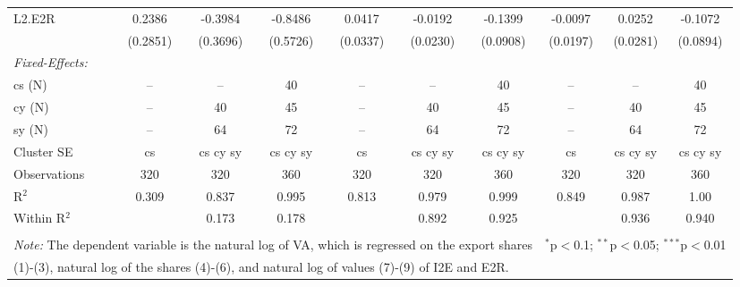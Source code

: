 \documentclass[a4paper]{article}
\begin{document}
\begin{table}[h!]
{\begin{tabular}[t]{lccccccccc}
L2.E2R&0.2386 & -0.3984 & -0.8486 & 0.0417 & -0.0192 & -0.1399 & -0.0097 & 0.0252 & -0.1072\\
  &(0.2851) & (0.3696) & (0.5726) & (0.0337) & (0.0230) & (0.0908) & (0.0197) & (0.0281) & (0.0894)\\%
\midrule \emph{Fixed-Effects:} &   &   &   &   &   &  \\
cs (N) & -- & -- & 40 & -- & -- & 40 & -- & -- & 40\\
cy (N) & -- & 40 & 45 & -- & 40 & 45 & -- & 40 & 45\\
sy (N) & -- & 64 & 72 & -- & 64 & 72 & -- & 64 & 72\\
\midrule
Cluster SE & cs & cs cy sy & cs cy sy & cs & cs cy sy & cs cy sy & cs & cs cy sy & cs cy sy\\
Observations & 320&320&360&320&320&360&320&320&360\\
R$^2$ & 0.309&0.837&0.995&0.813&0.979&0.999&0.849&0.987&1.00\\
Within R$^2$ & &0.173&0.178&&0.892&0.925&&0.936&0.940\\ \bottomrule \\[-1em]
\multicolumn{7}{l}{\small \textit{Note:} The dependent variable is the natural log of VA, which is regressed on the  export shares}   & \multicolumn{3}{r}{$^{*}$p$<$0.1; $^{**}$p$<$0.05; $^{***}$p$<$0.01} \\ [-0.2em]
\multicolumn{10}{l}{\small \quad \quad \quad (1)-(3), natural log of the shares (4)-(6), and natural log of values (7)-(9) of I2E and E2R.} \\
\end{tabular}
}
\end{table}
\FloatBarrier

\end{document}
